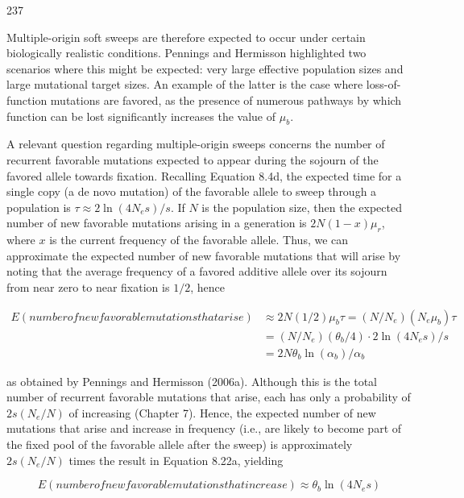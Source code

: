 \documentclass{article}
\begin{document}
237

Multiple-origin soft sweeps are therefore expected to occur under certain biologically realistic conditions. Pennings and Hermisson highlighted two scenarios where this might be expected: very large effective population sizes and large mutational target sizes. An example of the latter is the case where loss-of-function mutations are favored, as the presence of numerous pathways by which function can be lost significantly increases the value of  $ \mu_{b} $.

A relevant question regarding multiple-origin sweeps concerns the number of recurrent favorable mutations expected to appear during the sojourn of the favored allele towards fixation. Recalling Equation 8.4d, the expected time for a single copy (a de novo mutation) of the favorable allele to sweep through a population is  $ \tau \approx 2 \ln(4N_e s) / s $. If  $ N $ is the population size, then the expected number of new favorable mutations arising in a generation is  $ 2N(1 - x)\mu_r $, where  $ x $ is the current frequency of the favorable allele. Thus, we can approximate the expected number of new favorable mutations that will arise by noting that the average frequency of a favored additive allele over its sojourn from near zero to near fixation is  $ 1/2 $, hence

\begin{equation}
\begin{aligned}E(number of new favorable mutations that arise)&\approx2N(1/2)\mu_{b}\tau=(N/N_{e})(N_{e}\mu_{b})\tau\\&=(N/N_{e})(\theta_{b}/4)\cdot2\ln(4N_{e}s)/s\\&=2N\theta_{b}\ln(\alpha_{b})/\alpha_{b}\tag{8.22a}\end{aligned}
\end{equation}

as obtained by Pennings and Hermisson (2006a). Although this is the total number of recurrent favorable mutations that arise, each has only a probability of  $ 2s(N_e/N) $ of increasing (Chapter 7). Hence, the expected number of new mutations that arise and increase in frequency (i.e., are likely to become part of the fixed pool of the favorable allele after the sweep) is approximately  $ 2s(N_e/N) $ times the result in Equation 8.22a, yielding

\begin{equation}
E(number of new favorable mutations that increase)\approx\theta_{b}\ln(4N_{e}s)
\tag{8.22b}
\label{eq:8_22b}
\end{equation}
\end{document}
